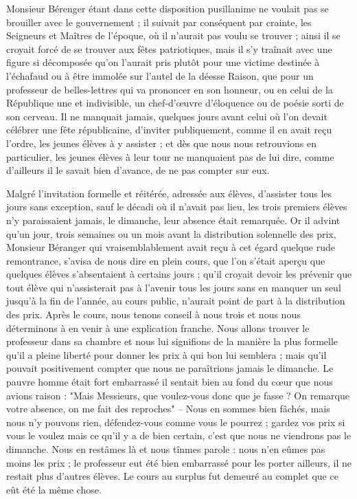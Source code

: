 \documentclass[11pt,a4paper]{report}
\begin{document}
Monsieur Bérenger étant dans cette disposition pusillanime ne voulait pas se brouiller avec le gouvernement ; il suivait par conséquent par crainte, les Seigneurs et Maîtres de l'époque, où il n'aurait pas voulu se trouver ; ainsi il se croyait forcé de se trouver aux fêtes patriotiques, mais il s'y traînait avec une figure si décomposée qu'on l'aurait pris plutôt pour une victime destinée à l'échafaud ou à être immolée sur l'autel de la déesse Raison, que pour un professeur de belles-lettres qui va prononcer en son honneur, ou en celui de la République une et indivisible, un chef-d'œuvre d'éloquence ou de poésie sorti de son cerveau. Il ne manquait jamais, quelques jours avant celui où l'on devait célébrer une fête républicaine, d'inviter publiquement, comme il en avait reçu l'ordre, les jeunes élèves à y assister ; et dès que nous nous retrouvions en particulier, les jeunes élèves à leur tour ne manquaient pas de lui dire, comme d'ailleurs il le savait bien d'avance, de ne pas compter sur eux.

Malgré l'invitation formelle et réitérée, adressée aux élèves, d'assister tous les jours sans exception, sauf le décadi où il n'avait pas lieu, les trois premiers élèves n'y paraissaient jamais, le dimanche, leur absence était remarquée. Or il advint qu'un jour, trois semaines ou un mois avant la distribution solennelle des prix, Monsieur Béranger qui vraisemblablement avait reçu à cet égard quelque rude remontrance, s'avisa de nous dire en plein cours, que l'on s'était aperçu que quelques élèves s'absentaient à certains jours ; qu'il croyait devoir les prévenir que tout élève qui n'assisterait pas à l'avenir tous les jours sans en manquer un seul jusqu'à la fin de l'année, au cours public, n'aurait point de part à la distribution des prix. Après le cours, nous tenons conseil à nous trois et nous nous déterminons à en venir à une explication franche. Nous allons trouver le professeur dans sa chambre et nous lui signifions de la manière la plus formelle qu'il a pleine liberté pour donner les prix à qui bon lui semblera ; mais qu'il pouvait positivement compter que nous ne paraîtrions jamais le dimanche. Le pauvre homme était fort embarrassé il sentait bien au fond du cœur que nous avions raison : "Mais Messieurs, que voulez-vous donc que je fasse ? On remarque votre absence, on me fait des reproches" -- Nous en sommes bien fâchés, mais nous n'y pouvons rien, défendez-vous comme vous le pourrez ; gardez vos prix si vous le voulez mais ce qu'il y a de bien certain, c'est que nous ne viendrons pas le dimanche. Nous en restâmes là et nous tînmes parole : nous n'en eûmes pas moins les prix ; le professeur eut été bien embarrassé pour les porter ailleurs, il ne restait plus d'autres élèves. Le cours au surplus fut demeuré au complet que ce eût été la même chose.
\end{document}
